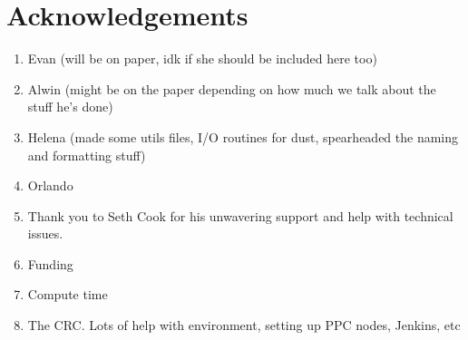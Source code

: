 \section{Acknowledgements}

\begin{enumerate}
    \item Evan (will be on paper, idk if she should be included here too)
    \item Alwin (might be on the paper depending on how much we talk about the stuff he's done)
    \item Helena (made some utils files, I/O routines for dust, spearheaded the naming and formatting stuff)
    \item Orlando
    \item Thank you to Seth Cook for his unwavering support and help with technical issues.
    \item Funding
    \item Compute time
    \item The CRC. Lots of help with environment, setting up PPC nodes, Jenkins, etc
\end{enumerate}